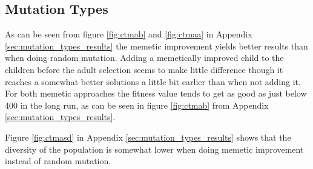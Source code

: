 
\subsection{Mutation Types} %
\label{sub:mutation_types}

As can be seen from figure \ref{fig:ctmab} and \ref{fig:ctmaa} in Appendix \ref{sec:mutation_types_results} the memetic improvement yields better results than when doing random mutation. Adding a memetically improved child to the children before the adult selection seems to make little difference though it reaches a somewhat better solutions a little bit earlier than when not adding it. For both memetic approaches the fitness value tends to get as good as just below 400 in the long run, as can be seen in figure \ref{fig:ctmab} from Appendix \ref{sec:mutation_types_results}.

Figure \ref{fig:ctmasd} in Appendix \ref{sec:mutation_types_results} shows that the diversity of the population is somewhat lower when doing memetic improvement instead of random mutation.





